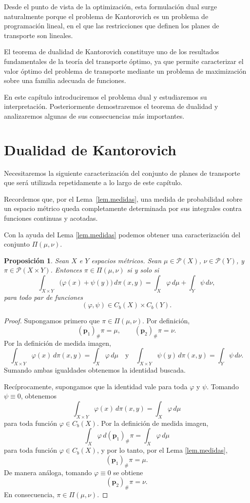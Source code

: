 \documentclass[12pt, a4paper]{amsbook}
\newtheorem{prop}[teo]{Proposición}
\theoremstyle{remark}
\theoremstyle{definition}
\numberwithin{section}{chapter}
\numberwithin{subsection}{section}
\numberwithin{equation}{section}
\numberwithin{figure}{chapter}
\begin{document}
Desde el punto de vista de la optimización, esta formulación dual surge naturalmente porque el problema de Kantorovich es un problema de programación lineal, en el que las restricciones que definen los planes de transporte son lineales.

El teorema de dualidad de Kantorovich constituye uno de los resultados
fundamentales de la teoría del transporte óptimo, ya que permite caracterizar el
valor óptimo del problema de transporte mediante un problema de maximización
sobre una familia adecuada de funciones.

En este capítulo introduciremos el problema dual y estudiaremos su interpretación.
Posteriormente demostraremos el teorema de dualidad y analizaremos algunas de sus
consecuencias más importantes.

\section{Dualidad de Kantorovich}

Necesitaremos la siguiente caracterización del conjunto de planes de transporte
que será utilizada repetidamente a lo largo de este capítulo.

Recordemos que, por el Lema~\ref{lem.medidas}, una medida de probabilidad
sobre un espacio métrico queda completamente determinada por sus integrales
contra funciones continuas y acotadas.

Con la ayuda del Lema \ref{lem.medidas} podemos obtener una caracterización del conjunto $\Pi(\mu, \nu)$.
\begin{prop}
Sean $X$ e $Y$ espacios métricos. Sean
$\mu\in\mathcal P(X)$, $\nu\in\mathcal P(Y)$, y 
$\pi\in\mathcal P(X\times Y)$. Entonces
\(
\pi\in\Pi(\mu,\nu)
\)
si y solo si
\[
\int_{X\times Y}
\bigl(\varphi(x)+\psi(y)\bigr)\,d\pi(x,y)
=
\int_X\varphi\,d\mu
+
\int_Y\psi\,d\nu,
\]
para todo par de funciones
\[
(\varphi,\psi)\in C_b(X)\times C_b(Y).
\]
\end{prop}

\begin{proof}
Supongamos primero que $\pi\in\Pi(\mu,\nu)$. Por definición,
\[
(\mathbf p_1)_\#\pi=\mu,
\qquad
(\mathbf p_2)_\#\pi=\nu.
\]
Por la definición de medida imagen,
\[
\int_{X\times Y}\varphi(x)\,d\pi(x,y)
=
\int_X\varphi\,d\mu
\quad
\text{y}
\quad
\int_{X\times Y}\psi(y)\,d\pi(x,y)
=
\int_Y\psi\,d\nu.
\]
Sumando ambas igualdades obtenemos la identidad buscada.

Recíprocamente, supongamos que la identidad vale para toda
$\varphi$ y $\psi$. Tomando $\psi\equiv0$, obtenemos
\[
\int_{X\times Y}\varphi(x)\,d\pi(x,y)
=
\int_X\varphi\,d\mu
\]
para toda función $\varphi\in C_b(X)$. Por la definición de medida
imagen,
\[
\int_X\varphi\,d(\mathbf p_1)_\#\pi
=
\int_X\varphi\,d\mu
\]
para toda función $\varphi\in C_b(X)$, y por lo tanto, por el Lema \ref{lem.medidas},
\[
(\mathbf p_1)_\#\pi=\mu.
\]
De manera análoga, tomando $\varphi\equiv0$ se obtiene
\[
(\mathbf p_2)_\#\pi=\nu.
\]
En consecuencia,
\(
\pi\in\Pi(\mu,\nu).
\)
\end{proof}
\end{document}
